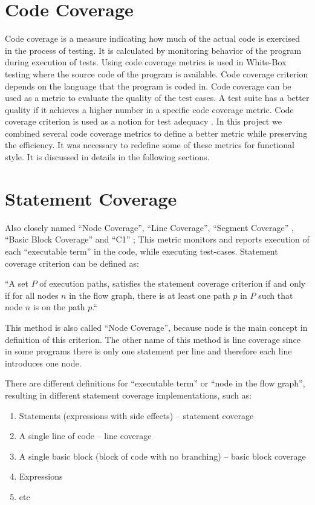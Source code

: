 \documentclass[12pt,a4paper]{report}
\begin{document}
\section{Code Coverage}
Code coverage is a measure indicating how much of the actual code is exercised in the process of testing. It is calculated by monitoring behavior of the program during execution of tests. Using code coverage metrics is used in White-Box testing where the source code of the program is available. Code coverage criterion depends on the language that the program is coded in. Code coverage can be used as a metric to evaluate the quality of the test cases. A test suite has a better quality if it achieves a higher number in a specific code coverage metric. Code coverage criterion is used as a notion for test adequacy
 \cite{Zhu:1997:SUT:267580.267590}.
In this project we combined several code coverage metrics to define a better metric while preserving the efficiency. It was necessary to redefine some
 of these metrics for functional style. It is discussed in details in the following sections.    

\section{Statement Coverage}
Also closely named ``Node Coverage'', ``Line Coverage'', ``Segment Coverage'' \cite{Ntafos:1988:CST:630792.631017},
 ``Basic Block Coverage'' and ``C1'' \cite{beizer2002software};
 This metric monitors and reports
 execution of each “executable term” in the code, while executing test-cases. Statement coverage criterion can
 be defined as: 

“A set $P$ of execution paths, satisfies the statement coverage criterion if and only if for all nodes $n$ in the flow graph, there is at least one path $p$
 in $P$ such that node $n$ is on the path $p$.“\cite{Zhu:1997:SUT:267580.267590}

This method is also called “Node Coverage”, because node is the main concept in definition of this criterion. The other name of this method is line coverage
 since in some programs there is only one statement per line and therefore each line introduces one node.

There are different definitions for “executable term” or “node in the flow graph”, resulting in different statement coverage implementations, such as:

\begin{enumerate}
 \item Statements (expressions with side effects) -- statement coverage
 \item A single line of code -- line coverage
 \item A single basic block (block of code with no branching) -- basic block coverage
 \item Expressions 
 \item etc
\end{enumerate}
\end{document}
